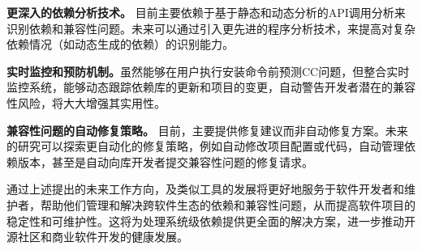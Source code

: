 \textbf{更深入的依赖分析技术。} \tool{}目前主要依赖于基于静态和动态分析的API调用分析来识别依赖和兼容性问题。未来可以通过引入更先进的程序分析技术，来提高对复杂依赖情况（如动态生成的依赖）的识别能力。

\textbf{实时监控和预防机制。}虽然\tool{}能够在用户执行安装命令前预测CC问题，但整合实时监控系统，能够动态跟踪依赖库的更新和项目的变更，自动警告开发者潜在的兼容性风险，将大大增强其实用性。

\textbf{兼容性问题的自动修复策略。} 目前，\tool{}主要提供修复建议而非自动修复方案。未来的研究可以探索更自动化的修复策略，例如自动修改项目配置或代码，自动管理依赖版本，甚至是自动向库开发者提交兼容性问题的修复请求。

通过上述提出的未来工作方向，\tool{}及类似工具的发展将更好地服务于软件开发者和维护者，帮助他们管理和解决跨软件生态的依赖和兼容性问题，从而提高软件项目的稳定性和可维护性。这将为处理系统级依赖提供更全面的解决方案，进一步推动开源社区和商业软件开发的健康发展。